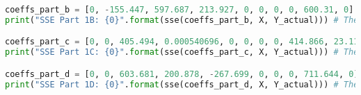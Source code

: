 \documentclass[15pt,a4paper,openright]{article}
\begin{document}
\begin{lstlisting}[language=Python, caption=1e Code]
coeffs_part_b = [0, -155.447, 597.687, 213.927, 0, 0, 0, 0, 600.31, 0] # The coefficients from part (b)
print("SSE Part 1B: {0}".format(sse(coeffs_part_b, X, Y_actual))) # The SSE using  the coefficients from part (b)

coeffs_part_c = [0, 0, 405.494, 0.000540696, 0, 0, 0, 0, 414.866, 23.1162] # The coefficients from part (c)
print("SSE Part 1C: {0}".format(sse(coeffs_part_c, X, Y_actual))) # The SSE using  the coefficients from part (c)

coeffs_part_d = [0, 0, 603.681, 200.878, -267.699, 0, 0, 0, 711.644, 0] # The coefficients from part (d)
print("SSE Part 1D: {0}".format(sse(coeffs_part_d, X, Y_actual))) # The SSE using  the coefficients from part (d)

\end{lstlisting}
\end{document}

